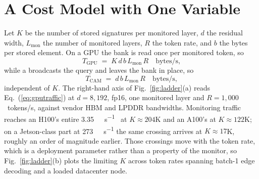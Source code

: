 \section{A Cost Model with One Variable}
\label{sec:Scaling}
\label{subsec:CostModel}
\label{subsec:Ladder}


Let $K$ be the number of stored signatures per monitored layer, $d$ the
residual width, $L_{\mathrm{mon}}$ the number of monitored layers, $R$
the token rate, and $b$ the bytes per stored element. On a GPU the bank
is read once per monitored token, so
%
\begin{equation}
T_{\mathrm{GPU}} \;=\; K \, d \, b \, L_{\mathrm{mon}} \, R
\quad\text{bytes/s,}
\label{eq:gputraffic}
\end{equation}
%
while a \cam broadcasts the query and leaves the bank in place, so
%
\begin{equation}
T_{\mathrm{CAM}} \;=\; d \, b \, L_{\mathrm{mon}} \, R
\quad\text{bytes/s,}
\label{eq:camtraffic}
\end{equation}
%
independent of $K$. The right-hand axis of Fig.~\ref{fig:ladder}(a)
reads Eq.~(\ref{eq:gputraffic}) at $d=8{,}192$, fp16, one monitored
layer and $R=1{,}000$~tokens/s, against vendor HBM and LPDDR
bandwidths. Monitoring traffic reaches an H100's entire
\qty{3.35}{\tera\byte\per\second}~\cite{nvidia_h100} at
$K\!\approx\!204$K and an A100's at $K\!\approx\!122$K; on a
Jetson-class part at \qty{273}{\giga\byte\per\second} the same
crossing arrives at $K\!\approx\!17$K, roughly an order of magnitude
earlier. Those crossings move with the token rate, which is a
deployment parameter rather than a property of the monitor, so
Fig.~\ref{fig:ladder}(b) plots the limiting $K$ across token rates
spanning batch-1 edge decoding and a loaded datacenter node.

